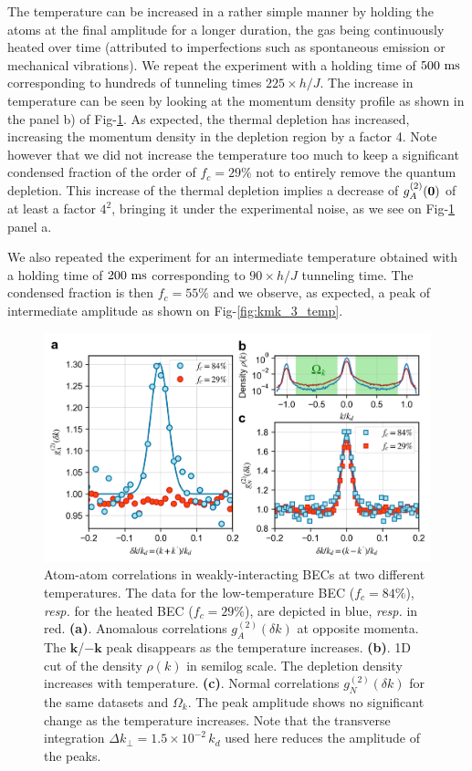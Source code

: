 The temperature can be increased in a rather simple manner by holding the atoms at the final amplitude for a longer duration, the gas being continuously heated over time (attributed to imperfections such as spontaneous emission or mechanical vibrations). We repeat the experiment with a holding time of $500 \ \rm{ms}$ corresponding to hundreds of tunneling times $225 \times h/J$. The increase in temperature can be seen by looking at the momentum density profile as shown in the panel b) of Fig-\ref{fig:kmk_temperature}. As expected, the thermal depletion has increased, increasing the momentum density in the depletion region by a factor 4. Note however that we did not increase the temperature too much to keep a significant condensed fraction of the order of $f_c = 29 \%$ not to entirely remove the quantum depletion. This increase of the thermal depletion implies a decrease of $g^{(2)}_A (\bm{0})$ of at least a factor $4^2$, bringing it under the experimental noise, as we see on Fig-\ref{fig:kmk_temperature} panel a.

We also repeated the experiment for an intermediate temperature obtained with a holding time of $200 \ \rm{ms}$ corresponding to $90 \times h/J$ tunneling time. The condensed fraction is then $f_c=55 \%$ and we observe, as expected, a peak of intermediate amplitude as shown on Fig-\ref{fig:kmk_3_temp}.

\begin{figure}
    \centering
    \includegraphics[width=\textwidth]{Fig/Chapter4/kmk_temperature.png}
    \caption{Atom-atom correlations in weakly-interacting BECs at two different temperatures. The data for the low-temperature BEC ($f_{c}=84\%$), {\it resp.} for the heated BEC ($f_{c}=29\%$), are depicted in blue, {\it resp.} in red. 
    {\bf (a)}. Anomalous correlations $g_{A}^{(2)}(\delta k)$ at opposite momenta. The ${\bm k}$/$-{\bm k}$ peak disappears as the temperature increases.
    {\bf (b)}. 1D cut of the density $\rho(k)$ in semilog scale. The depletion density increases with temperature.
    {\bf (c)}. Normal correlations $g_{N}^{(2)}(\delta k)$ for the same datasets and $\Omega_k$. The peak amplitude shows no significant change as the temperature increases. Note that the transverse integration $\Delta k_{\perp}=1.5 \times 10^{-2} \, k_d$ used here reduces the amplitude of the peaks.}
    \label{fig:kmk_temperature}
\end{figure}

